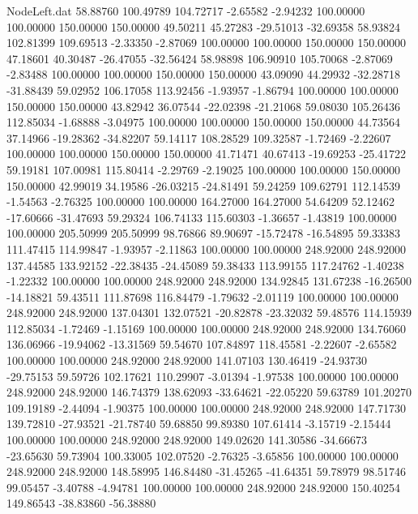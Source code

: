 \begin{filecontents}{NodeLeft.dat}
  58.88760  100.49789  104.72717    -2.65582   -2.94232  100.00000  100.00000  150.00000  150.00000   49.50211   45.27283  -29.51013  -32.69358
  58.93824  102.81399  109.69513    -2.33350   -2.87069  100.00000  100.00000  150.00000  150.00000   47.18601   40.30487  -26.47055  -32.56424
  58.98898  106.90910  105.70068    -2.87069   -2.83488  100.00000  100.00000  150.00000  150.00000   43.09090   44.29932  -32.28718  -31.88439
  59.02952  106.17058  113.92456    -1.93957   -1.86794  100.00000  100.00000  150.00000  150.00000   43.82942   36.07544  -22.02398  -21.21068
  59.08030  105.26436  112.85034    -1.68888   -3.04975  100.00000  100.00000  150.00000  150.00000   44.73564   37.14966  -19.28362  -34.82207
  59.14117  108.28529  109.32587    -1.72469   -2.22607  100.00000  100.00000  150.00000  150.00000   41.71471   40.67413  -19.69253  -25.41722
  59.19181  107.00981  115.80414    -2.29769   -2.19025  100.00000  100.00000  150.00000  150.00000   42.99019   34.19586  -26.03215  -24.81491
  59.24259  109.62791  112.14539    -1.54563   -2.76325  100.00000  100.00000  164.27000  164.27000   54.64209   52.12462  -17.60666  -31.47693
  59.29324  106.74133  115.60303    -1.36657   -1.43819  100.00000  100.00000  205.50999  205.50999   98.76866   89.90697  -15.72478  -16.54895
  59.33383  111.47415  114.99847    -1.93957   -2.11863  100.00000  100.00000  248.92000  248.92000  137.44585  133.92152  -22.38435  -24.45089
  59.38433  113.99155  117.24762    -1.40238   -1.22332  100.00000  100.00000  248.92000  248.92000  134.92845  131.67238  -16.26500  -14.18821
  59.43511  111.87698  116.84479    -1.79632   -2.01119  100.00000  100.00000  248.92000  248.92000  137.04301  132.07521  -20.82878  -23.32032
  59.48576  114.15939  112.85034    -1.72469   -1.15169  100.00000  100.00000  248.92000  248.92000  134.76060  136.06966  -19.94062  -13.31569
  59.54670  107.84897  118.45581    -2.22607   -2.65582  100.00000  100.00000  248.92000  248.92000  141.07103  130.46419  -24.93730  -29.75153
  59.59726  102.17621  110.29907    -3.01394   -1.97538  100.00000  100.00000  248.92000  248.92000  146.74379  138.62093  -33.64621  -22.05220
  59.63789  101.20270  109.19189    -2.44094   -1.90375  100.00000  100.00000  248.92000  248.92000  147.71730  139.72810  -27.93521  -21.78740
  59.68850   99.89380  107.61414    -3.15719   -2.15444  100.00000  100.00000  248.92000  248.92000  149.02620  141.30586  -34.66673  -23.65630
  59.73904  100.33005  102.07520    -2.76325   -3.65856  100.00000  100.00000  248.92000  248.92000  148.58995  146.84480  -31.45265  -41.64351
  59.78979   98.51746   99.05457    -3.40788   -4.94781  100.00000  100.00000  248.92000  248.92000  150.40254  149.86543  -38.83860  -56.38880

\end{filecontents}
